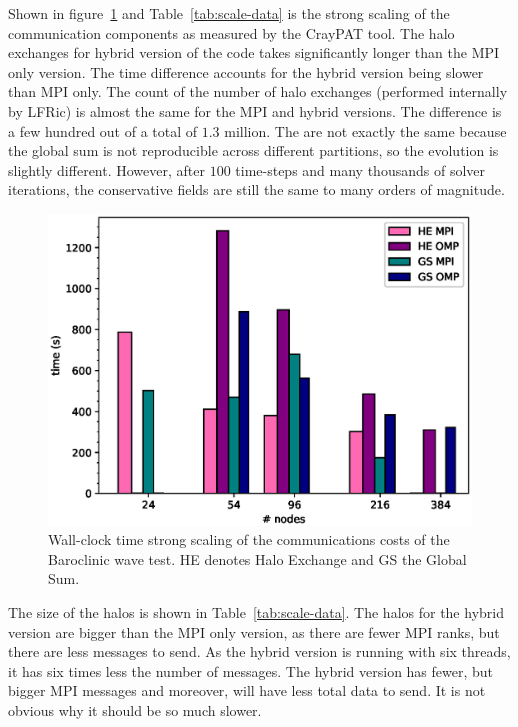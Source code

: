Shown in figure~\ref{fig:comms_scale} and Table~\ref{tab:scale-data}
is the strong scaling of the communication components as measured by
the CrayPAT tool. The halo exchanges for hybrid version of the code
takes significantly longer than the MPI only version. The time
difference accounts for the hybrid version being slower than MPI only.
The count of the number of halo exchanges (performed internally by
LFRic) is almost the same for the MPI and hybrid versions. The
difference is a few hundred out of a total of $1.3$ million. The are
not exactly the same because the global sum is not reproducible across
different partitions, so the evolution is slightly different. However,
after $100$ time-steps and many thousands of solver iterations, the
conservative fields are still the same to many orders of magnitude.

\begin{figure}[ht!]
\centering\includegraphics[width=1.0\linewidth]{figs/comms-scale.eps}
\caption{\label{fig:comms_scale}Wall-clock time strong scaling of the 
  communications costs of the Baroclinic wave test. HE denotes Halo
  Exchange and GS the Global Sum.}
\end{figure} 

The size of the halos is shown in Table~\ref{tab:scale-data}. The 
halos for the hybrid version are bigger than the MPI only version, as 
there are fewer MPI ranks, but there are less messages to send. As the 
hybrid version is running with six threads, it has six times less the 
number of messages. The hybrid version has fewer, but bigger MPI 
messages and moreover, will have less total data to send. It is not 
obvious why it should be so much slower. 

